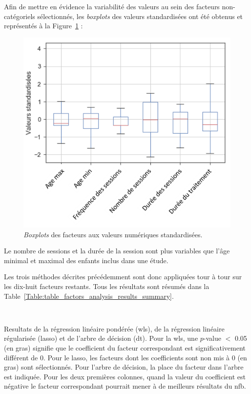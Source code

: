 Afin de mettre en évidence la variabilité des valeurs au sein des facteurs non-catégoriels sélectionnés, les \textit{boxplots} des valeurs standardisées ont 
été obtenus et représentés à la Figure~\ref{Figure:factors-boxplots} :
\begin{figure}[h!]
  \centering
	\includegraphics[width=0.7\linewidth]{figures/chapter-3/factors-distribution-of-factors} 
  \caption[\textit{Boxplots} des facteurs aux valeurs numériques standardisées.]{\textit{Boxplots} des facteurs aux valeurs numériques standardisées.} 
  \label{Figure:factors-boxplots}
\end{figure}

Le nombre de sessions et la durée de la session sont plus variables que l'âge minimal et maximal des enfants inclus dans une étude. 

Les trois méthodes décrites précédemment sont donc appliquées tour à tour sur les dix-huit facteurs restants. Tous les résultats sont résumés dans la 
Table~\ref{Table:table_factors_analysis_results_summary}.

\newpage\
\begin{table}[h!]
  \centering
  \caption[Resultats de l'analyse systématique des biais.]{Resultats de la régression linéaire pondérée (\gls{wls}), de la régression linéaire régularisée (\gls{lasso}) et de l'arbre de décision (\gls{dt}). Pour la \gls{wls}, une $p$-value $<$ 0.05 
	(en gras) signifie que le coefficient du facteur correspondant est significativement différent de 0. Pour le \gls{lasso}, les facteurs dont les coefficients sont non mis à 0 (en gras) sont 
	sélectionnés. Pour l'arbre de décision, la place du facteur dans l'arbre est indiquée. Pour les deux premières colonnes, quand la valeur du coefficient est négative le facteur 
	correspondant pourrait mener à de meilleurs résultats du \gls{nfb}.}
  
  \label{Table:table_factors_analysis_results_summary}
\end{table}

